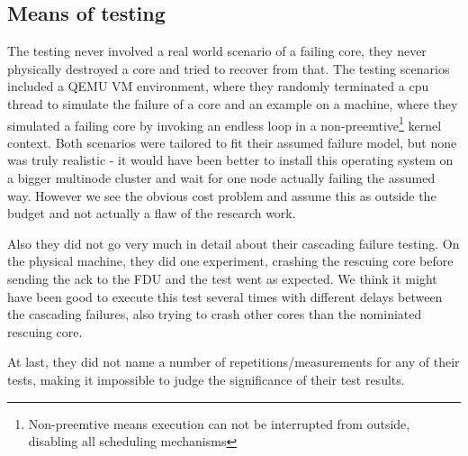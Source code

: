 \documentclass[a4paper,10pt,twoside]{article}
\begin{document}
\subsection{Means of testing}
The testing never involved a real world scenario of a failing core, they never physically destroyed a core and tried to recover from that. The testing scenarios included a QEMU VM environment, where they randomly terminated a cpu thread to simulate the failure of a core and an example on a machine, where they simulated a failing core by invoking an endless loop in a non-preemtive\footnote{Non-preemtive means execution can not be interrupted from outside, disabling all scheduling mechanisms} kernel context. Both scenarios were tailored to fit their assumed failure model, but none was truly realistic - it would have been better to install this operating system on a bigger multinode cluster and wait for one node actually failing the assumed way. However we see the obvious cost problem and assume this as outside the budget and not actually a flaw of the research work.

Also they did not go very much in detail about their cascading failure testing. On the physical machine, they did one experiment, crashing the rescuing core before sending the ack to the FDU and the test went as expected. We think it might have been good to execute this test several times with different delays between the cascading failures, also trying to crash other cores than the nominiated rescuing core.

At last, they did not name a number of repetitions/measurements for any of their tests, making it impossible to judge the significance of their test results.


\end{document}
